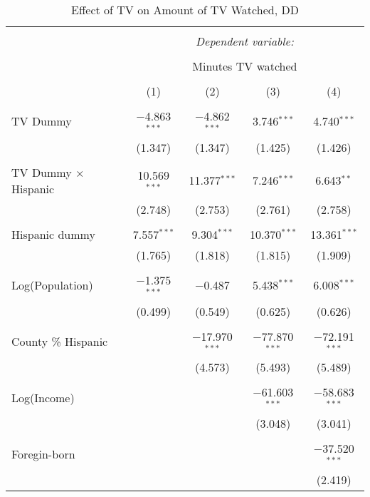 
\begin{table}[!htbp] \centering 
  \caption{Effect of TV on Amount of TV Watched, DD} 
  \label{} 
\begin{tabular}{@{\extracolsep{-5pt}}lcccc} 
\\[-1.8ex]\hline 
\hline \\[-1.8ex] 
 & \multicolumn{4}{c}{\textit{Dependent variable:}} \\ 
\cline{2-5} 
\\[-1.8ex] & \multicolumn{4}{c}{Minutes TV watched} \\ 
\\[-1.8ex] & (1) & (2) & (3) & (4)\\ 
\hline \\[-1.8ex] 
 TV Dummy & $-$4.863$^{***}$ & $-$4.862$^{***}$ & 3.746$^{***}$ & 4.740$^{***}$ \\ 
  & (1.347) & (1.347) & (1.425) & (1.426) \\ 
  & & & & \\ 
 TV Dummy $\times$ Hispanic  & 10.569$^{***}$ & 11.377$^{***}$ & 7.246$^{***}$ & 6.643$^{**}$ \\ 
  & (2.748) & (2.753) & (2.761) & (2.758) \\ 
  & & & & \\ 
 Hispanic dummy & 7.557$^{***}$ & 9.304$^{***}$ & 10.370$^{***}$ & 13.361$^{***}$ \\ 
  & (1.765) & (1.818) & (1.815) & (1.909) \\ 
  & & & & \\ 
 Log(Population) & $-$1.375$^{***}$ & $-$0.487 & 5.438$^{***}$ & 6.008$^{***}$ \\ 
  & (0.499) & (0.549) & (0.625) & (0.626) \\ 
  & & & & \\ 
 County \% Hispanic &  & $-$17.970$^{***}$ & $-$77.870$^{***}$ & $-$72.191$^{***}$ \\ 
  &  & (4.573) & (5.493) & (5.489) \\ 
  & & & & \\ 
 Log(Income) &  &  & $-$61.603$^{***}$ & $-$58.683$^{***}$ \\ 
  &  &  & (3.048) & (3.041) \\ 
  & & & & \\ 
 Foregin-born &  &  &  & $-$37.520$^{***}$ \\ 
  &  &  &  & (2.419) \\ 

\end{tabular}
\end{table}
